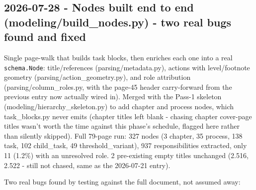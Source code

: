 \subsection*{2026-07-28 - Nodes built end to end (modeling/build\_nodes.py) - two real bugs found and fixed}
Single page-walk that builds task blocks, then enriches each one into a real \texttt{schema.Node}: title/references (parsing/metadata.py), actions with level/footnote geometry (parsing/action\_geometry.py), and role attribution (parsing/column\_roles.py, with the page-45 header carry-forward from the previous entry now actually wired in). Merged with the Pass-1 skeleton (modeling/hierarchy\_skeleton.py) to add chapter and process nodes, which task\_blocks.py never emits (chapter titles left blank - chasing chapter cover-page titles wasn't worth the time against this phase's schedule, flagged here rather than silently skipped). Full 79-page run: 327 nodes (3 chapter, 35 process, 138 task, 102 child\_task, 49 threshold\_variant), 937 responsibilities extracted, only 11 (1.2\%) with an unresolved role. 2 pre-existing empty titles unchanged (2.516, 2.522 - still not chased, same as the 2026-07-21 entry).

Two real bugs found by testing against the full document, not assumed away:

